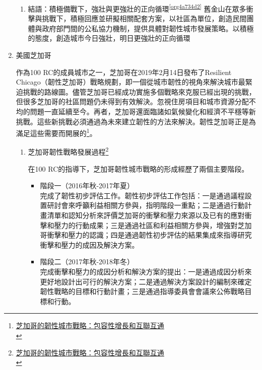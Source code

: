 \documentclass[a4paper,12pt]{article}
\begin{document}
\begin{enumerate}
\begin{enumerate}
\item 結語：積極備戰下，強壯與更強壯的正向循環\textsuperscript{\ref{org4a734d2}}
\label{sec:orgf522c62}
舊金山在眾多衝擊與挑戰下，積極回應並研擬相關配套方案，以社區為單位，創造民間團體與政府部門間的公私協力機制，提供具體對韌性城市發展策略。以積極的態度，創造城市今日強壯，明日更強壯的正向循環\\
\end{enumerate}

\item 美國芝加哥
\label{sec:org074e157}

作為100 RC的成員城市之一，芝加哥在2019年2月14日發布了Resilient Chicago（韌性芝加哥）戰略規劃，即一個從城市韌性的視角來解決城市最緊迫挑戰的路線圖。儘管芝加哥已經成功實施多個戰略來克服已經出現的挑戰，但很多芝加哥的社區問題仍未得到有效解決。忽視住房項目和城市資源分配不均的問題一直延續至今。再者，芝加哥還面臨諸如氣候變化和經濟不平穩等新挑戰。這些新挑戰必須通過為未來建立韌性的方法來解決。韌性芝加哥正是為滿足這些需要而開展的\footnote{\href{https://kknews.cc/zh-tw/news/pvvn99e.html}{芝加哥的韌性城市戰略：包容性增長和互聯互通}\\}。\\

\begin{enumerate}
\item 芝加哥韌性戰略發展過程\footnote{\href{https://mp.weixin.qq.com/s?\_\_biz=MzU2MzAwODQ4Nw==\&mid=2247489943\&idx=1\&sn=a1987dbeae81fb25d008b398ec8a205d\&chksm=fc619f1fcb161609ce22efb7b7bd8e9ae6d1e0e51dcb5b7fc9c7700d6c117f7467b2c4ebf215\&scene=27\#wechat\_redirect}{芝加哥的韌性城市戰略：包容性增長和互聯互通}\\}
\label{sec:orgb7189d9}

在100 RC的指導下，芝加哥韌性城市戰略的形成經歷了兩個主要階段。\\
\begin{itemize}
\item 階段一（2016年秋-2017年夏）\\
完成了韌性初步評估工作。韌性初步評估工作包括：一是通過議程設置研討會來呼籲利益相關方參與，指明階段一重點；二是通過行動計畫清單和認知分析來評價芝加哥的衝擊和壓力來源以及已有的應對衝擊和壓力的行動成果；三是通過社區和利益相關方參與，增強對芝加哥衝擊和壓力的認識；四是通過韌性初步評估的結果集成來指導研究衝擊和壓力的成因及解決方案。\\
\item 階段二（2017年秋-2018年冬）\\
完成衝擊和壓力的成因分析和解決方案的提出：一是通過成因分析來更好地設計出可行的解決方案；二是通過解決方案設計的編制來確定韌性戰略的目標和行動計畫；三是通過指導委員會會議來公佈戰略目標和行動。\\
\end{itemize}


\end{enumerate}
\end{enumerate}
\end{document}
